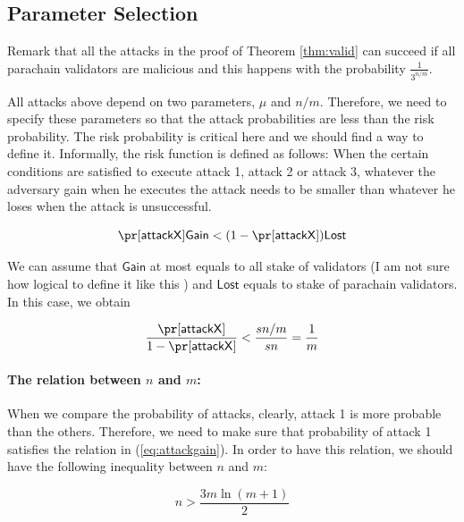 
\subsection{Parameter Selection}

Remark that all the attacks in the proof of Theorem \ref{thm:valid} can succeed if all parachain validators are malicious and this happens with the probability $\frac{1}{3^{n/m}}$.


All attacks above depend on two parameters, $\mu$ and $n/m$. Therefore, we need to specify these parameters so that the attack probabilities are less than the risk probability. The risk probability is critical here and we should find a way to define it. Informally, the risk function is defined as follows: When the certain conditions are satisfied to execute attack 1, attack 2 or attack 3, whatever the adversary gain when he executes the attack needs to be smaller than whatever he loses when the attack is unsuccessful. 

\begin{equation}
    \pr[\mathsf{attack X}]\mathsf{Gain} < (1-\pr[\mathsf{attack X}])\mathsf{Lost}
\end{equation}

We can assume that $\mathsf{Gain}$ at most equals to all stake of validators (I am not sure how logical to define it like this ) and $\mathsf{Lost}$ equals to stake of parachain validators. In this case, we obtain

\begin{equation}\label{eq:attackgain}
    \frac{\pr[\mathsf{attack X}]}{1-\pr[\mathsf{attack X}]} < \frac{sn/m}{sn} = \frac{1}{m}
\end{equation}

\paragraph{The relation between $n$ and $m$:} When we compare the probability of attacks, clearly, attack 1 is more probable than the others. Therefore, we need to make sure that probability of attack 1 satisfies the relation in (\ref{eq:attackgain}). In order to have this relation, we should have the following inequality between $n$ and $m$:

\begin{equation}\label{eq:relation}
    n > \frac{3m\ln(m+1)}{2}
\end{equation}

